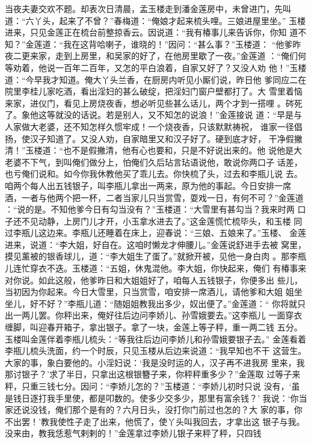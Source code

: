 当夜夫妻交欢不题。却表次日清晨，孟玉楼走到潘金莲房中，未曾进门，先叫
道：“六丫头，起来了不曾？”春梅道：“俺娘才起来梳头哩。三娘进屋里坐。”
玉楼进来，只见金莲正在梳台前整掠香云。因说道：“我有椿事儿来告诉你，你知
道不知？”金莲道：“我在这背哈喇子，谁晓的！”因问：“甚么事？”玉楼道：
“他爹昨夜二更来家，走到上房里，和吴家的好了，在他房里歇了一夜。”金莲道
：“俺们何等劝着，他说一百年二百年，又怎的平白浪着，自家又好了？又没人劝
他！”玉楼道：“今早我才知道。俺大丫头兰香，在厨房内听见小厮们说，昨日他
爹同应二在院里李桂儿家吃酒，看出淫妇的甚么破绽，把淫妇门窗户壁都打了。大
雪里着恼来家，进仪门，看见上房烧夜香，想必听见些甚么话儿，两个才到一搭哩
。硶死了。象他这等就没的话说。若是别人，又不知怎的说浪！”金莲接说
道：“早是与人家做大老婆，还不知怎样久惯牢成！一个烧夜香，只该默默祷祝，
谁家一径倡扬，使汉子知道了。又没人劝，自家暗里又和汉子好了。硬到底才好，
干净假撇清！”玉楼道：“也不是假撇清，他有心也要和，只是不好说出来的。他
说他是大老婆不下气，到叫俺们做分上，怕俺们久后玷言玷语说他，敢说你两口子
话差，也亏俺们说和。如今你我休教他买了乖儿去。你快梳了头，过去和李瓶儿说
去。咱两个每人出五钱银子，叫李瓶儿拿出一两来，原为他的事起。今日安排一席
酒，一者与他两个把一杯，二者当家儿只当赏雪，耍戏一日，有何不可？”金莲道
：“说的是。不知他爹今日有勾当没有？”玉楼道：“大雪里有甚勾当？我来时两
口子还不见动静，上房门儿才开，小玉拿水进去了。”这金莲慌忙梳毕头，和玉楼
同过李瓶儿这边来。李瓶儿还睡着在床上，迎春说：“三娘、五娘来了。”玉楼、
金莲进来，说道：“李大姐，好自在。这咱时懒龙才伸腰儿。”金莲说舒进手去被
窝里，摸见薰被的银香球儿，道：“李大姐生了蛋了。”就掀开被，见他一身白肉
。那李瓶儿连忙穿衣不迭。玉楼道：“五姐，休鬼混他。李大姐，你快起来，俺们
有椿事来对你说。如此这般，他爹昨日和大姐姐好了，咱每人五钱银子，你便多出
些儿，当初因为你起来。今日大雪里，只当赏雪，咱安排一席酒儿，请他爹和大姐
姐坐坐儿，好不好？”李瓶儿道：“随姐姐教我出多少，奴出便了。”金莲道：“
你将就只出一两儿罢。你秤出来，俺好往后边问李娇儿、孙雪娥要去。”这李瓶儿
一面穿衣缠脚，叫迎春开箱子，拿出银子。拿了一块，金莲上等子秤，重一两二钱
五分。玉楼叫金莲伴着李瓶儿梳头：“等我往后边问李娇儿和孙雪娥要银子去。”
金莲看着李瓶儿梳头洗面，约一个时辰，只见玉楼从后边来说道：“我早知也不干
这营生。大家的事，象白要他的。小淫妇说：‘我是没时运的人，汉子再不进我房
里来，我那讨银子？’求了半日，只拿出这根银簪子来，你秤秤重多少？”金莲取
过等子来秤，只重三钱七分。因问：“李娇儿怎的？”玉楼道：“李娇儿初时只说
没有，‘虽是钱日逐打我手里使，都是叩数的。使多少交多少，那里有富余钱？’
我说：‘你当家还说没钱，俺们那个是有的？六月日头，没打你门前过也怎的？大
家的事，你不出罢！’教我使性子走了出来，他慌了，使丫头叫我回去，才拿出这
银子与我。没来由，教我恁惹气剌剌的！”金莲拿过李娇儿银子来秤了秤，只四钱
